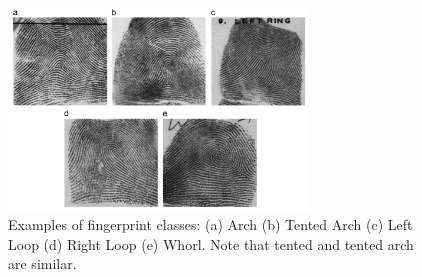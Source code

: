 \begin{figure}[!ht]
	\begin{center}
		\includegraphics[width=8cm]{fig/Fingerprint_classes.png}
	\end{center}
	\caption{Examples of fingerprint classes: (a) Arch (b) Tented Arch (c) Left Loop (d) Right Loop  (e) Whorl. Note  that tented and tented arch are similar. \cite{cao2013fingerprint}} 
	\label{fig.fingerprint_classes}
\end{figure}

